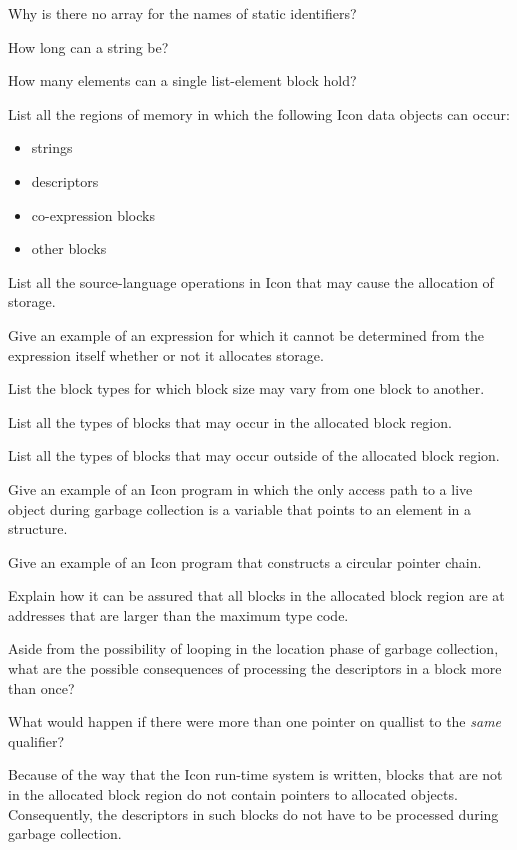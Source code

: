  Why is there no array for the names of static identifiers?

 How long can a string be?

 How many elements can a single list-element block
hold?

 List all the regions of memory in which the
following Icon data objects can occur:
\begin{itemize}
\item 
strings
\item 
descriptors
\item 
co-expression blocks
\item 
other blocks
\end{itemize}

 List all the source-language operations in Icon
that may cause the allocation of storage.

 Give an example of an expression for which it
cannot be determined from the expression itself whether or not it
allocates storage.

 List the block types for which block size may
vary from one block to another.

 List all the types of blocks that may occur in
the allocated block region.

 List all the types of blocks that may occur
outside of the allocated block region.

 Give an example of an Icon program in which the
only access path to a live object during garbage collection is a
variable that points to an element in a structure.

 Give an example of an Icon program that
constructs a circular pointer chain.

 Explain how it can be assured that all blocks in
the allocated block region are at addresses that are larger than the
maximum type code.

 Aside from the possibility of looping in the
location phase of garbage collection, what are the possible
consequences of processing the descriptors in a block more than once?

 What would happen if there were more than one
pointer on quallist to the \textit{same} qualifier?

 Because of the way that the Icon run-time system
is written, blocks that are not in the allocated block region do not
contain pointers to allocated objects. Consequently, the descriptors
in such blocks do not have to be processed during garbage collection.

